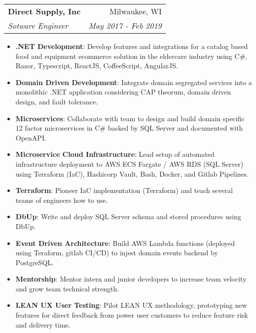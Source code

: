 \documentclass[letterpaper,11pt]{article}
\makeatletter
\newcommand{\resumeItem}[2]{
  \item\small{
    \textbf{#1}{: #2 \vspace{-2pt}}
  }
}
\newcommand{\resumeSubheading}[4]{
  \vspace{-1pt}\item
    \begin{tabular*}{0.97\textwidth}{l@{\extracolsep{\fill}}r}
      \textbf{#1} & #2 \\
      \textit{\small#3} & \textit{\small #4} \\
    \end{tabular*}\vspace{-5pt}
}
\newcommand{\resumeItemListStart}{\begin{itemize}}
\newcommand{\resumeItemListEnd}{\end{itemize}\vspace{-5pt}}
\makeatother
\begin{document}
    \resumeSubheading
      {Direct Supply, Inc}{Milwaukee, WI}
      {Sotware Engineer}{May 2017 - Feb 2019}
      \resumeItemListStart
        \resumeItem{.NET Development}
          {Develop features and integrations for a catalog based food and equipment ecommerce solution in the eldercare industry using C\#, Razor, Typescript, ReactJS, CoffeeScript, AngularJS.}
        \resumeItem{Domain Driven Development}
          {Integrate domain segregated services into a monolithic .NET application considering CAP theorum, domain driven design, and fault tolerance.}
        \resumeItem{Microservices}
          {Collaborate with team to design and build domain specific 12 factor microservices in C\# backed by SQL Server and documented with OpenAPI.}
        \resumeItem{Microservice Cloud Infrastructure}
          {Lead setup of automated infrastructure deployment to AWS ECS Fargate / AWS RDS (SQL Server) using Terraform (IaC), Hashicorp Vault, Bash, Docker, and Gitlab Pipelines.}
        \resumeItem{Terraform}
          {Pioneer IaC implementation (Terraform) and teach several teams of engineers how to use.}
        \resumeItem{DbUp}
          {Write and deploy SQL Server schema and stored procedures using DbUp.}
        \resumeItem{Event Driven Architecture}
          {Build AWS Lambda functions (deployed using Teraform, gitlab CI/CD) to injest domain events backend by PostgreSQL.}
        \resumeItem{Mentorship}
          {Mentor intern and junior developers to increase team velocity and grow team technical strength.}
        \resumeItem{LEAN UX User Testing}
          {Pilot LEAN UX methodology, prototyping new features for direct feedback from power user customers to reduce feature risk and delivery time.}

      \resumeItemListEnd
\end{document}
